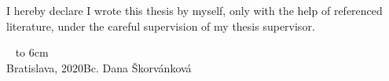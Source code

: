 \documentclass[12pt, a4paper, oneside]{book}
\newcommand\mfauthor{Bc. Dana Škorvánková}
\newcommand\mfplacedate{Bratislava, 2020}
\begin{document}

\thispagestyle{empty}


\begin{figure}[H]
\begin{center}
\label{img:zadanie}
\end{center}
\end{figure}

{~}\vspace{12cm}

\noindent
\begin{minipage}{0.25\textwidth}~\end{minipage}
\begin{minipage}{0.75\textwidth}
I hereby declare I wrote this thesis by myself, only with the help of
referenced literature, under the careful supervision of my thesis
supervisor.
\newline \newline
\end{minipage}
\vfill
~ \hfill {\hbox to 6cm{\dotfill}} \\
\mfplacedate \hfill \mfauthor
\vfill\eject 
\end{document}
